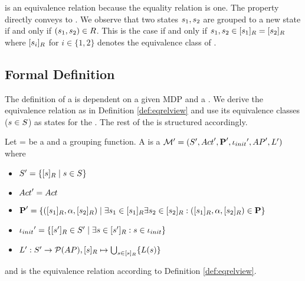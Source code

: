 \documentclass[preview]{standalone}
\begin{document}
\eqrelview is an equivalence relation because the equality relation is one. The property directly conveys to \eqrelview. We observe that two states ${s}_1, {s}_2$ are grouped to a new state if and only if $({s}_1, {s}_2) \in {R}$. This is the case if and only if ${s}_1, {s}_2 \in {\ensuremath{{[{s}_1]_{{R}}}}} = {{[{s}_2]_{{R}}}}$ where ${{[{s}_i]_{{R}}}}$ for $i \in \{1,2\}$ denotes the equivalence class of \eqrelview.

\subsection{Formal Definition}

The definition of a \viewN is dependent on a given MDP and a \grpfctN \grpfct. We derive the equivalence relation \eqrelview as in Definition \ref{def:eqrelview} and use its equivalence classes  (${s} \in {S}$) as states for the \viewN. The rest of the \chosengraphtypeN is structured accordingly.


\begin{definition}
	
	Let \chgph = \chgphtuple be a \chosengraphtypeN and \grpfct a grouping function. A \emph{\viewN} \view{\viewppty} is a \chosengraphtypeN ${{\mathcal{M}}}' = {{({S}', {Act}', {\textbf{P}}', {\iota_{init}}', {AP}', {L}')}}$  where
	
	\begin{itemize}
		\item ${S}' = \{ {[{s}]_{{R}}} \mid {s} \in {S} \}$
		
		\item ${Act}' = {Act}$
		
		\item ${{\textbf{P}}}' = \{ ({{[{s}_1]_{{R}}}}, {\alpha}, {{[{s}_2]_{{R}}}}) \mid \exists {s}_1 \in {\ensuremath{{[{s}_1]_{{R}}}}} \exists {s}_2 \in {\ensuremath{{[{s}_2]_{{R}}}}} : ({{[{s}_1]_{{R}}}}, {\alpha}, {{[{s}_2]_{{R}}}}) \in {\ensuremath{{\textbf{P}}}}\}$%
		
		\item ${{\iota_{init}}}' = \{{{[{s}']_{{R}}}} \in {S}' \mid \exists {s} \in {\ensuremath{{[{s}']_{{R}}}}} : {s} \in {\ensuremath{{\iota_{init}}}} \}$
		
		\item ${L}': {S}' \to {\mathcal{P}(\ensuremath{{AP}})}, {{[{s}]_{{R}}}}\mapsto \bigcup_{{s} \in {\ensuremath{{[{s}]_{{R}}}}}} \{{L}({s})\}$
		
	\end{itemize}
	
	and \eqrelview is the equivalence relation according to Definition \ref{def:eqrelview}.
	

	\label{def:view}	
\end{definition}
\end{document}
